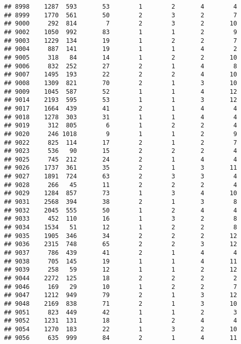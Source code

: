 \documentclass[]{article}
\begin{document}
\begin{verbatim}
## 8998    1287  593       53        1        2       4        4
## 8999    1770  561       50        2        3       2        7
## 9000     292  814        7        2        3       2       10
## 9002    1050  992       83        1        1       2        9
## 9003    1229  134       19        1        2       2        7
## 9004     887  141       19        1        1       4        2
## 9005     318   84       14        1        2       2       10
## 9006     832  252       27        2        1       4        8
## 9007    1495  193       22        2        2       4       10
## 9008    1309  821       70        2        1       3       10
## 9009    1045  587       52        1        1       4       12
## 9014    2193  595       53        1        1       3       12
## 9017    1664  439       41        2        1       4        4
## 9018    1278  303       31        1        1       4        4
## 9019     312  805        6        1        2       2        4
## 9020     246 1018        9        1        1       2        9
## 9022     825  114       17        2        1       2        7
## 9023     536   90       15        2        2       2        4
## 9025     745  212       24        2        1       4        4
## 9026    1737  361       35        2        1       3       11
## 9027    1891  724       63        2        3       3        4
## 9028     266   45       11        2        2       2        4
## 9029    1284  857       73        1        3       4       10
## 9031    2568  394       38        2        1       3        8
## 9032    2045  555       50        1        2       4        4
## 9033     452  110       16        1        3       2        8
## 9034    1534   51       12        1        2       2        8
## 9035    1905  346       34        2        2       2       12
## 9036    2315  748       65        2        2       3       12
## 9037     786  439       41        2        1       4        4
## 9038     705  145       19        1        1       4       11
## 9039     258   59       12        1        1       2       12
## 9044    2272  125       18        2        2       2        2
## 9046     169   29       10        1        2       2        7
## 9047    1212  949       79        2        1       3       12
## 9048    2169  838       71        2        1       3       10
## 9051     823  449       42        1        1       2        3
## 9052    1231  131       18        1        2       4        4
## 9054    1270  183       22        1        3       2       10
## 9056     635  999       84        2        1       4       11

\end{verbatim}
\end{document}
